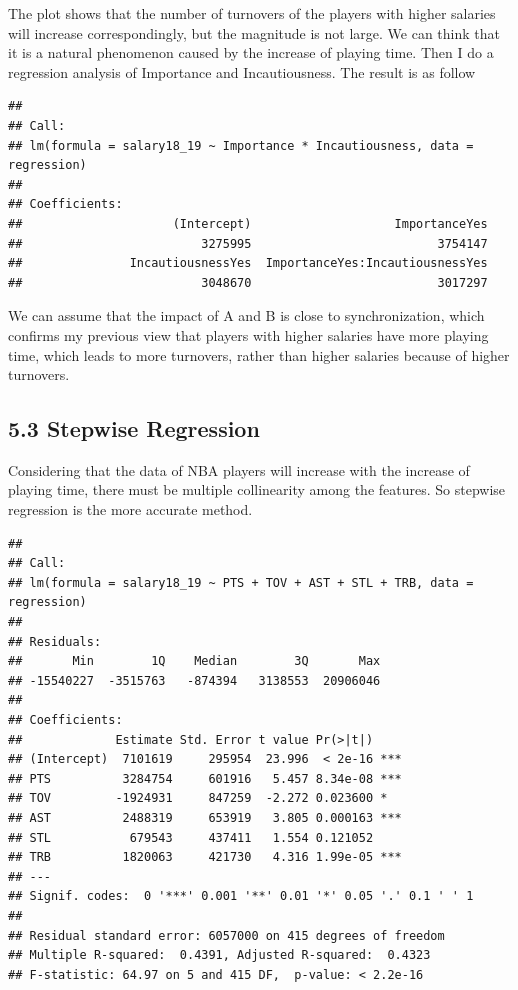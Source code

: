 \documentclass[]{article}
\begin{document}
The plot shows that the number of turnovers of the players with higher
salaries will increase correspondingly, but the magnitude is not large.
We can think that it is a natural phenomenon caused by the increase of
playing time. Then I do a regression analysis of Importance and
Incautiousness. The result is as follow

\begin{verbatim}
## 
## Call:
## lm(formula = salary18_19 ~ Importance * Incautiousness, data = regression)
## 
## Coefficients:
##                     (Intercept)                    ImportanceYes  
##                         3275995                          3754147  
##               IncautiousnessYes  ImportanceYes:IncautiousnessYes  
##                         3048670                          3017297
\end{verbatim}

We can assume that the impact of A and B is close to synchronization,
which confirms my previous view that players with higher salaries have
more playing time, which leads to more turnovers, rather than higher
salaries because of higher turnovers.

\subsection{5.3 Stepwise Regression}\label{stepwise-regression}

Considering that the data of NBA players will increase with the increase
of playing time, there must be multiple collinearity among the features.
So stepwise regression is the more accurate method.

\begin{verbatim}
## 
## Call:
## lm(formula = salary18_19 ~ PTS + TOV + AST + STL + TRB, data = regression)
## 
## Residuals:
##       Min        1Q    Median        3Q       Max 
## -15540227  -3515763   -874394   3138553  20906046 
## 
## Coefficients:
##             Estimate Std. Error t value Pr(>|t|)    
## (Intercept)  7101619     295954  23.996  < 2e-16 ***
## PTS          3284754     601916   5.457 8.34e-08 ***
## TOV         -1924931     847259  -2.272 0.023600 *  
## AST          2488319     653919   3.805 0.000163 ***
## STL           679543     437411   1.554 0.121052    
## TRB          1820063     421730   4.316 1.99e-05 ***
## ---
## Signif. codes:  0 '***' 0.001 '**' 0.01 '*' 0.05 '.' 0.1 ' ' 1
## 
## Residual standard error: 6057000 on 415 degrees of freedom
## Multiple R-squared:  0.4391, Adjusted R-squared:  0.4323 
## F-statistic: 64.97 on 5 and 415 DF,  p-value: < 2.2e-16
\end{verbatim}
\end{document}
